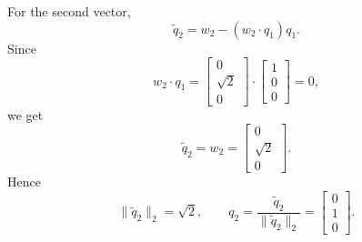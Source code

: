 \documentclass[12pt]{article}
\begin{document}
\begin{enumerate}[label=(\alph*)]
  For the second vector,
  \[
    \widetilde q_2=w_2-(w_2\cdot q_1)q_1.
  \]
  Since
  \[
    w_2\cdot q_1=
    \begin{bmatrix}0\\\sqrt2\\0\end{bmatrix}
    \cdot
    \begin{bmatrix}1\\0\\0\end{bmatrix}
    =0,
  \]
  we get
  \[
    \widetilde q_2=w_2=\begin{bmatrix}0\\\sqrt2\\0\end{bmatrix}.
  \]
  Hence
  \[
    \|\widetilde q_2\|_2=\sqrt2,
    \qquad
    q_2=\frac{\widetilde q_2}{\|\widetilde q_2\|_2}
    =
    \begin{bmatrix}0\\1\\0\end{bmatrix}.
  \]


\end{enumerate}
\end{document}
